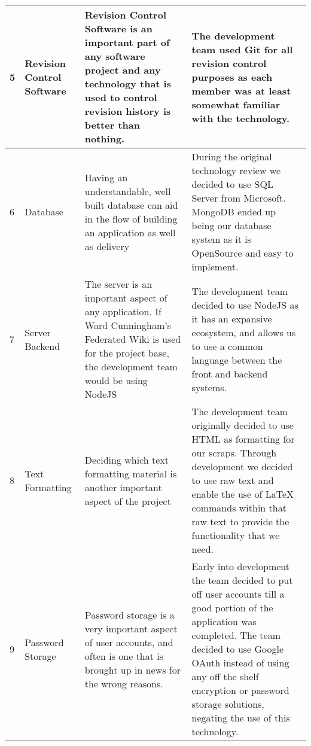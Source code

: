 \documentclass[onecolumn, draftclsnofoot,10pt, compsoc]{IEEEtran}
\begin{document}
\begin{flushleft}
\begin{supertabular}{|p{0.5cm}|p{3cm}|p{5.5cm}|p{7cm}|}
		5 & Revision Control Software & Revision Control Software is an important part of any software project and any technology that is used to control revision history is better than nothing. & The development team used Git for all revision control purposes as each member was at least somewhat familiar with the technology.
		\\\hline
		
		6 & Database & Having an understandable, well built database can aid in the flow of building an application as well as delivery & During the original technology review we decided to use SQL Server from Microsoft. MongoDB ended up being our database system as it is OpenSource and easy to implement.
		\\\hline
		
		7 & Server Backend & The server is an important aspect of any application. If Ward Cunningham's Federated Wiki is used for the project base, the development team would be using NodeJS & The development team decided to use NodeJS as it has an expansive ecosystem, and allows us to use a common language between the front and backend systems.
		\\\hline
		
		8 & Text Formatting & Deciding which text formatting material is another important aspect of the project & The development team originally decided to use HTML as formatting for our scraps. Through development we decided to use raw text and enable the use of LaTeX commands within that raw text to provide the functionality that we need.
		\\\hline
		
		9 & Password Storage & Password storage is a very important aspect of user accounts, and often is one that is brought up in news for the wrong reasons. & Early into development the team decided to put off user accounts till a good portion of the application was completed. The team decided to use Google OAuth instead of using any off the shelf encryption or password storage solutions, negating the use of this technology.
		\\\hline
		
		
	\end{supertabular}
\end{flushleft}
\end{document}
